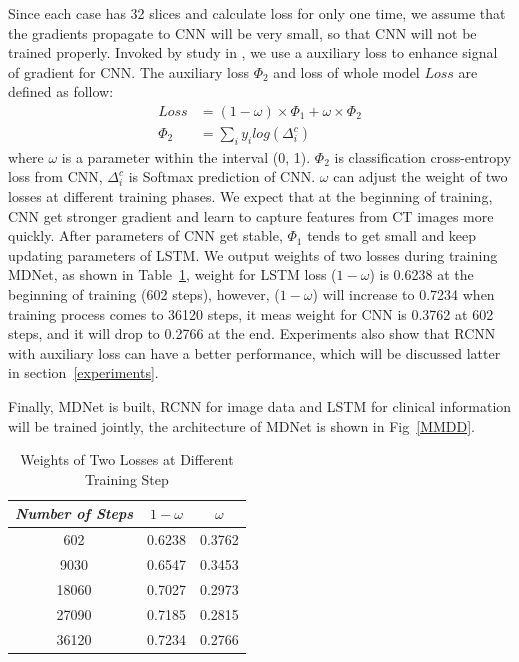 \documentclass[journal]{IEEEtran}
\begin{document}
Since each case has 32 slices and calculate loss for only one time, we assume that the gradients propagate to CNN will be very small, so that CNN will not be trained properly. Invoked by study in \cite{szegedy2016rethinking}, we use a auxiliary loss to enhance signal of gradient for CNN.
The auxiliary loss $\Phi_2$ and loss of whole model $Loss$ are defined as follow: 
\begin{align*}
Loss &=  (1 - \omega) \times \Phi_1 +  \omega \times \Phi_2 \\
\Phi_2 &= \sum_i{y_i log(\Delta^c_i)}
\end{align*}
where $\omega$ is a parameter within the interval (0, 1). $\Phi_2$ is classification cross-entropy loss from CNN, $\Delta^c_i$ is Softmax prediction of CNN. $\omega$ can adjust the weight of two losses at different training phases.
We expect that at the beginning of training, CNN get stronger gradient and learn to capture features from CT images more quickly. After parameters of CNN get stable, $\Phi_1$ tends to get small and keep updating parameters of LSTM. We output weights of two losses during training MDNet, as shown in Table~\ref{weights}, weight for LSTM loss ($1 - \omega$) is 0.6238 at the beginning of training (602 steps), however, ($1 - \omega$) will increase to 0.7234 when training process comes to 36120 steps, it meas weight for CNN is 0.3762 at 602 steps, and it will drop to 0.2766 at the end. Experiments also show that RCNN with auxiliary loss can have a better performance, which will be discussed latter in section~\ref{experiments}.

Finally, MDNet is built, RCNN for image data and LSTM for clinical information will be trained jointly, the architecture of MDNet is shown in Fig~\ref{MMDD}. 

\begin{table}[t]
\vspace{-0cm}
\caption{Weights of Two Losses at Different Training Step}
\vspace{-0cm}
\begin{center}
\begin{tabular}{|c|c|c|}
\hline
\textbf{\textit{Number of Steps}} & \textbf{\textit{$1 - \omega$}} & \textbf{\textit{$\omega$}}\\
\hline
602 &0.6238 & 0.3762  \\
9030 &0.6547 & 0.3453  \\
18060 &0.7027 & 0.2973  \\
27090 &0.7185 & 0.2815  \\
36120 &0.7234 & 0.2766  \\

\hline
\end{tabular}
\vspace{-0cm}
\label{weights}
\end{center}
\vspace{-0cm}
\end{table}
\end{document}
